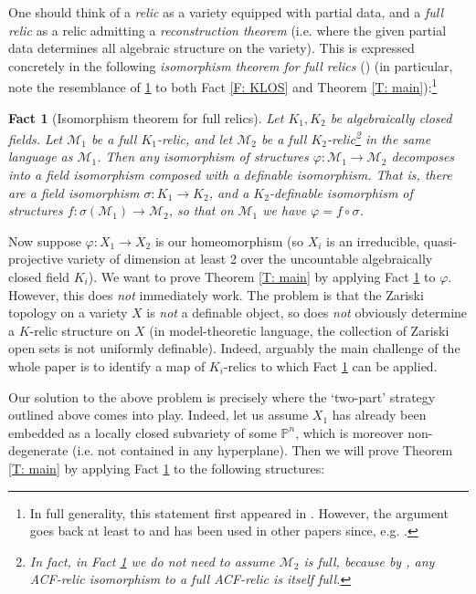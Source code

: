 \documentclass{amsart}
\newtheorem{fact}[theorem]{Fact}
\theoremstyle{definition}
\begin{document}
One should think of a \textit{relic} as a variety equipped with partial data, and a \textit{full relic} as a relic admitting a \textit{reconstruction theorem} (i.e. where the given partial data determines all algebraic structure on the variety). This is expressed concretely in the following \textit{isomorphism theorem for full relics} (\cite[Lemma 2.6]{CaHaDC}) (in particular, note the resemblance of \ref{F: iso thm} to both Fact \ref{F: KLOS} and Theorem \ref{T: main}):\footnote{In full generality, this statement first appeared in \cite{CaHaDC}. However, the argument goes back at least to \cite{PoizatBT} and has been used in other papers since, e.g. \cite[Lemma 2.3]{CasHasAV}.}

\begin{fact}[Isomorphism theorem for full relics]\label{F: iso thm} Let $K_1,K_2$ be algebraically closed fields. Let $\mathcal M_1$ be a full $K_1$-relic, and let $\mathcal M_2$ be a full $K_2$-relic\footnote{In fact, in Fact \ref{F: iso thm} we do not need to assume $\mathcal M_2$ is full, because by \cite[Remark 4.13]{CasHasVA}, any ACF-relic isomorphism to a full ACF-relic is itself full.} in the same language as $\mathcal M_1$. Then any isomorphism of structures $\varphi:\mathcal M_1\rightarrow\mathcal M_2$ decomposes into a field isomorphism composed with a definable isomorphism. That is, there are a field isomorphism $\sigma:K_1\rightarrow K_2$, and a $K_2$-definable isomorphism of structures $f:\sigma(\mathcal M_1)\rightarrow\mathcal M_2$, so that on $\mathcal M_1$ we have $\varphi=f\circ\sigma$.
\end{fact}

Now suppose $\varphi:X_1\rightarrow X_2$ is our homeomorphism (so $X_i$ is an irreducible, quasi-projective variety of dimension at least 2 over the uncountable algebraically closed field $K_i$). We want to prove Theorem \ref{T: main} by applying Fact \ref{F: iso thm} to $\varphi$. However, this does \textit{not} immediately work. The problem is that the Zariski topology on a variety $X$ is \textit{not} a definable object, so does \textit{not} obviously determine a $K$-relic structure on $X$ (in model-theoretic language, the collection of Zariski open sets is not uniformly definable). Indeed, arguably the main challenge of the whole paper is to identify a map of $K_i$-relics to which Fact \ref{F: iso thm} can be applied. 

Our solution to the above problem is precisely where the `two-part' strategy outlined above comes into play. Indeed, let us assume $X_1$ has already been embedded as a locally closed subvariety of some $\mathbb P^n$, which is moreover non-degenerate (i.e. not contained in any hyperplane). Then we will prove Theorem \ref{T: main} by applying Fact \ref{F: iso thm} to the following structures:
\end{document}
